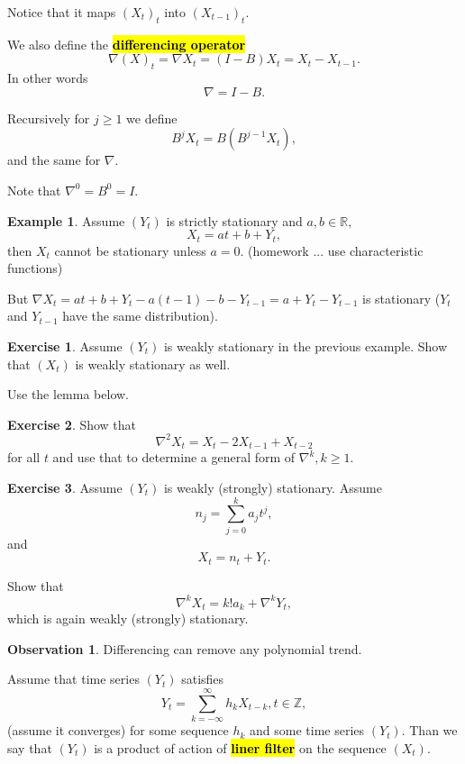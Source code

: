 \documentclass[12pt,a4paper, notitlepage]{book}
\newcommand{\hlc}[2][yellow]{ {\sethlcolor{#1} \hl{#2}} }
\newcommand{\hlcr}[1]{\hlc[lightred]{#1}}
\theoremstyle{definition} %
\newtheorem{example}{Example}[chapter]
\newtheorem{exercise}{Exercise}[chapter]
\newtheorem*{observation}{Observation}
\theoremstyle{plain} %
\newcommand{\R}{\mathbb R}
\newcommand{\Z}{\mathbb Z}
\newcommand{\New}[1]{ {\bf \hlcr{#1} } }
\begin{document}
Notice that it maps $(X_t)_t$ into $(X_{t-1})_t$.

We also define the \New{ differencing operator} 
\[ \nabla(X)_t = \nabla X_t = (I - B) X_t = X_t - X_{t-1} . \]
 In other words
\[ \nabla = I - B . \]

Recursively for $j \geq 1$ we define 
\[ B^j X_t = B (B^{j-1} X_t) , \]
 and the same for $\nabla$.

Note that $\nabla^0 = B^0 = I$. 

\begin{example}
Assume $(Y_t)$ is strictly stationary and $a,b \in \R, $
\[ X_t = a t + b + Y_t, \]
 then $X_t$ cannot be stationary unless $a = 0$. (homework ... use characteristic functions)

But 
$\nabla X_t = at + b + Y_t - a(t-1) - b - Y_{t-1} = a + Y_t - Y_{t-1}$ is stationary ($Y_t$ and $Y_{t-1}$ have the same distribution).  
\end{example}


\begin{exercise}
Assume $(Y_t)$ is weakly stationary in the previous example. Show that $(X_t)$ is weakly stationary as well.

\end{exercise}
\begin{hint} Use the lemma below.
\end{hint}

\begin{exercise}
Show that
\[ \nabla^2 X_t = X_t - 2X_{t-1} + X_{t-2} \] 
 for all $t$ and use that to determine a general form of $\nabla^k, k \geq 1$.
\end{exercise}


\begin{exercise}
Assume $(Y_t)$ is weakly (strongly) stationary. Assume 
\[ n_j = \sum_{j=0}^k a_j t^j , \]
 and 
\[ X_t = n_t + Y_t . \]

Show that 
\[ \nabla^k X_t = k! a_k + \nabla^k Y_t , \]
 which is again weakly (strongly) stationary.  
\end{exercise}

\begin{observation}
Differencing can remove any polynomial trend. 
\end{observation}


Assume that time series $(Y_t)$ satisfies 
\[ Y_t = \sum_{k = -\infty}^\infty h_k X_{t-k}, t \in \Z , \]
 (assume it converges) for some sequence $h_k$ and some time series $(Y_t)$. Than we say that $(Y_t)$ is a product of action of \New{ liner filter} on the sequence $(X_t)$.  
\end{document}
